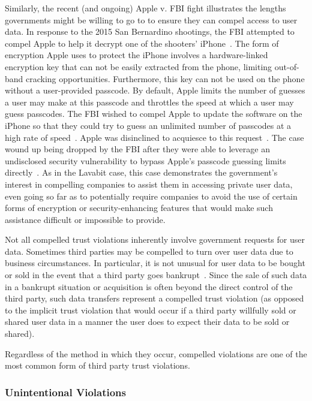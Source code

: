 Similarly, the recent (and ongoing) Apple v. FBI fight illustrates the
lengths governments might be willing to go to to ensure they can
compel access to user data.  In response to the 2015 San Bernardino
shootings, the FBI attempted to compel Apple to help it decrypt one of
the shooters' iPhone~\cite{ars-cookvfbi}. The form of encryption Apple
uses to protect the iPhone involves a hardware-linked encryption key
that can not be easily extracted from the phone, limiting out-of-band
cracking opportunities. Furthermore, this key can not be used on the
phone without a user-provided passcode. By default, Apple limits the
number of guesses a user may make at this passcode and throttles the
speed at which a user may guess passcodes. The FBI wished to compel
Apple to update the software on the iPhone so that they could try to
guess an unlimited number of passcodes at a high rate of
speed~\cite{eff-applecrypto}. Apple was disinclined to acquiesce to
this request~\cite{apple-fbiletter}. The case wound up being dropped
by the FBI after they were able to leverage an undisclosed security
vulnerability to bypass Apple's passcode guessing limits
directly~\cite{ars-fbi-breakthrough, ars-fbi-greyhats}. As in the
Lavabit case, this case demonstrates the government's interest in
compelling companies to assist them in accessing private user data,
even going so far as to potentially require companies to avoid the use
of certain forms of encryption or security-enhancing features that
would make such assistance difficult or impossible to provide.

Not all compelled trust violations inherently involve government
requests for user data. Sometimes third parties may be compelled to
turn over user data due to business circumstances. In particular, it
is not unusual for user data to be bought or sold in the event that a
third party goes bankrupt~\cite{nguyen2004, singer2015,
  solove2015}. Since the sale of such data in a bankrupt situation or
acquisition is often beyond the direct control of the third party,
such data transfers represent a compelled trust violation (as opposed
to the implicit trust violation that would occur if a third party
willfully sold or shared user data in a manner the user does to expect
their data to be sold or shared).

Regardless of the method in which they occur, compelled violations are
one of the most common form of third party trust violations.

\subsubsection{Unintentional Violations}

